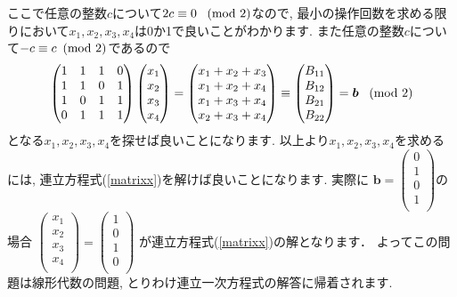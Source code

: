 \documentclass[dvipdfmx,a4paper,11pt]{article}
\theoremstyle{definition}
\begin{document}
ここで任意の整数$c$について$2c \equiv 0 \text{\,\,\, (mod 2)}$なので, 最小の操作回数を求める限りにおいて$x_1, x_2, x_3, x_4$は0か1で良いことがわかります.
また任意の整数$c$について$-c \equiv c \text{\,\,\,(mod 2)}$であるので
\begin{equation}
\label{matrixx}
\begin{pmatrix}
1&1&1&0\\
1&1&0&1\\
1&0&1&1\\
0&1&1&1\\
 \end{pmatrix}
\begin{pmatrix}
x_1\\
x_2\\
x_3 \\
x_4\\
 \end{pmatrix}
=
\begin{pmatrix}
x_1+x_2+x_3 \\
 x_1+x_2+x_4 \\
x_1+x_3+x_4 \\
 x_2+x_3 + x_4\\
 \end{pmatrix}
 \equiv
\begin{pmatrix}
B_{11} \\
B_{12} \\
B_{21} \\
B_{22} \\
 \end{pmatrix} 
 =
 \bm{b} \text{\,\,\, (mod 2)}
\end{equation}
となる$x_1, x_2, x_3, x_4$を探せば良いことになります.
以上より$x_1, x_2, x_3, x_4$を求めるには, 連立方程式(\ref{matrixx})を解けば良いことになります.
実際に
$
\bm{b} 
 =
   \begin{pmatrix}
0 \\
1\\
0\\
1\\
 \end{pmatrix} 
 $の場合
$
\begin{pmatrix}
x_1\\
x_2\\
x_3 \\
x_4\\
 \end{pmatrix}
 =
 \begin{pmatrix}
1 \\
0\\
1\\
0\\
 \end{pmatrix}  
$
 が連立方程式(\ref{matrixx})の解となります．
 よってこの問題は線形代数の問題, とりわけ連立一次方程式の解答に帰着されます.
\end{document}
